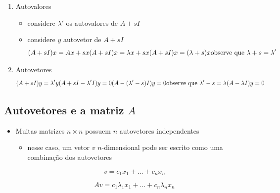 \documentclass[
  letterpaper,
  DIV=11,
  numbers=noendperiod]{scrartcl}
\providecommand{\tightlist}{%
  \setlength{\itemsep}{0pt}\setlength{\parskip}{0pt}}\usepackage{longtable,booktabs,array}
\begin{document}
\begin{enumerate}
\def\labelenumi{\arabic{enumi}.}
\item
  Autovalores

  \begin{itemize}
  \tightlist
  \item
    considere \(\lambda'\) os autovalores de \(A+ sI\)
  \item
    considere \(y\) autovetor de \(A + sI\) \begin{equation}
    (A+ sI)x = Ax + sx\\ 
    (A+sI)x= \lambda x + sx\\ 
    (A+sI)x = (\lambda + s)x\\
    \text{observe que } \lambda+s = \lambda'\\
    \end{equation}
  \end{itemize}
\item
  Autovetores \begin{equation}
  (A + sI)y = \lambda'y\\ 
  (A + sI - \lambda'I)y = 0\\ 
  (A - (\lambda' -s)I)y = 0\\
  \text{observe que } \lambda'-s = \lambda\\
  (A - \lambda I)y = 0
  \end{equation}
\end{enumerate}

\hypertarget{autovetores-e-a-matriz-a}{%
\subsection{\texorpdfstring{Autovetores e a matriz
\(A\)}{Autovetores e a matriz A}}\label{autovetores-e-a-matriz-a}}

\begin{itemize}
\item
  Muitas matrizes \(n\times n\) possuem \(n\) autovetores independentes

  \begin{itemize}
  \tightlist
  \item
    nesse caso, um vetor \(v\) \(n\)-dimensional pode ser escrito como
    uma combinação dos autovetores
  \end{itemize}

  \[ v = c_1x_1+\ldots + c_nx_n\]

  \[ Av = c_1\lambda_1x_1+\ldots + c_n\lambda_nx_n\]
\end{itemize}
\end{document}
